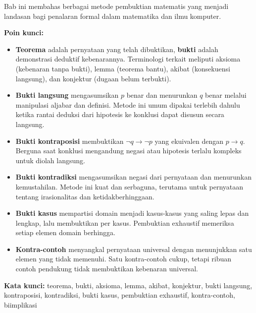 \documentclass[../main]{subfiles}
\begin{document}
\begin{rangkuman}
Bab ini membahas berbagai metode pembuktian matematis yang menjadi landasan bagi penalaran formal dalam matematika dan ilmu komputer.

\textbf{Poin kunci:}
\begin{itemize}
  \item \textbf{Teorema} adalah pernyataan yang telah dibuktikan, \textbf{bukti} adalah demonstrasi deduktif kebenarannya. Terminologi terkait meliputi aksioma (kebenaran tanpa bukti), lemma (teorema bantu), akibat (konsekuensi langsung), dan konjektur (dugaan belum terbukti).
  \item \textbf{Bukti langsung} mengasumsikan $p$ benar dan menurunkan $q$ benar melalui manipulasi aljabar dan definisi. Metode ini umum dipakai terlebih dahulu ketika rantai deduksi dari hipotesis ke konklusi dapat disusun secara langsung.
  \item \textbf{Bukti kontraposisi} membuktikan $\neg q \rightarrow \neg p$ yang ekuivalen dengan $p \rightarrow q$. Berguna saat konklusi mengandung negasi atau hipotesis terlalu kompleks untuk diolah langsung.
  \item \textbf{Bukti kontradiksi} mengasumsikan negasi dari pernyataan dan menurunkan kemustahilan. Metode ini kuat dan serbaguna, terutama untuk pernyataan tentang irasionalitas dan ketidakberhinggaan.
  \item \textbf{Bukti kasus} mempartisi domain menjadi kasus-kasus yang saling lepas dan lengkap, lalu membuktikan per kasus. Pembuktian exhaustif memeriksa setiap elemen domain berhingga.
  \item \textbf{Kontra-contoh} menyangkal pernyataan universal dengan menunjukkan satu elemen yang tidak memenuhi. Satu kontra-contoh cukup, tetapi ribuan contoh pendukung tidak membuktikan kebenaran universal.
\end{itemize}

\textbf{Kata kunci:} teorema, bukti, aksioma, lemma, akibat, konjektur, bukti langsung, kontraposisi, kontradiksi, bukti kasus, pembuktian exhaustif, kontra-contoh, biimplikasi
\end{rangkuman}

\ifSubfilesClassLoaded{
  \renewcommand{\bibname}{Daftar Pustaka}
  
  
}{}
\end{document}
